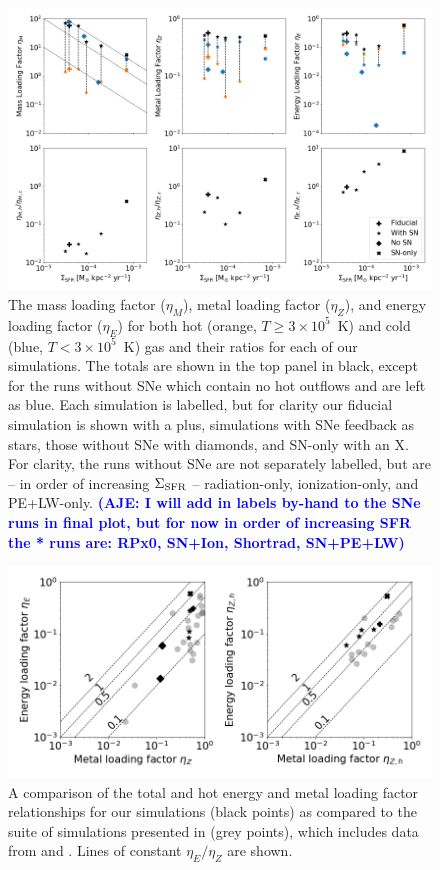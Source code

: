 \documentclass[twocolumn]{aastex62}
\newcommand{\aje}[1]{\textcolor{blue}{\textbf{(AJE: #1)}}}
\begin{document}
\begin{figure}
  \centering
  \includegraphics[width=0.95\linewidth]{figures/phys_comparison_mass_metal_hot_cold_SFR}
  \caption{The mass loading factor ($\eta_M$), metal loading factor ($\eta_Z$), and energy loading factor ($\eta_E$) for both hot (orange, $T \geq 3 \times 10^5$~K) and cold (blue, $T < 3 \times 10^5$~K) gas and their ratios for each of our simulations. The totals are shown in the top panel in black, except for the runs without SNe which contain no hot outflows and are left as blue. Each simulation is labelled, but for clarity our fiducial simulation is shown with a plus, simulations with SNe feedback as stars, those without SNe with diamonds, and SN-only with an X. For clarity, the runs without SNe are not separately labelled, but are -- in order of increasing $\Sigma_{\rm SFR}$ -- radiation-only, ionization-only, and PE+LW-only. \aje{I will add in labels by-hand to the SNe runs in final plot, but for now in order of increasing SFR the * runs are: RPx0, SN+Ion, Shortrad, SN+PE+LW} }
  \label{fig:loading_factors}
\end{figure}

\begin{figure}
  \centering
  \includegraphics[width=0.95\linewidth]{figures/phys_comparison_E_loading_Z_loading}
  \caption{A comparison of the total and hot energy and metal loading factor relationships for our simulations (black points) as compared to the suite of simulations presented in \citet{LiBryan2020} (grey points), which includes data from \citet{Li2017,KimOstriker2018,Fielding2018,Hu2018,Armillotta2019,Martizzi2016} and \citet{Creasey2015}. Lines of constant $\eta_E / \eta_Z$ are shown.}
  \label{fig:loading_relation}
\end{figure}
\end{document}
